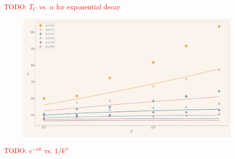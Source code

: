 \documentclass[11pt,a4paper]{article}
\newcommand{\todo}[1]{\textcolor{red}{TODO: #1}}
\begin{document}
\todo{$T_C$ vs. $\alpha$ for exponential decay}
\begin{figure}[ht!]
    \includegraphics[width=\linewidth]{../figures/TC_vs_size.pdf}
\end{figure}

\todo{$e^{-\alpha k}$ vs. $1/k^\alpha$}
\end{document}
